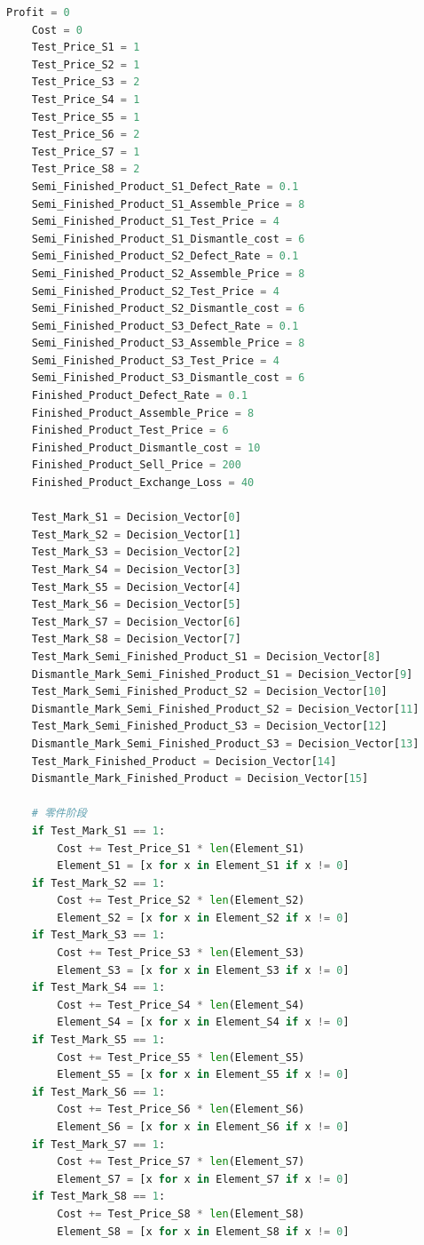 \documentclass[withoutpreface,bwprint]{cumcmthesis} %
\begin{document}
\begin{appendices}
\begin{lstlisting}[language=python]
    Profit = 0
    Cost = 0
    Test_Price_S1 = 1
    Test_Price_S2 = 1
    Test_Price_S3 = 2
    Test_Price_S4 = 1
    Test_Price_S5 = 1
    Test_Price_S6 = 2
    Test_Price_S7 = 1
    Test_Price_S8 = 2
    Semi_Finished_Product_S1_Defect_Rate = 0.1
    Semi_Finished_Product_S1_Assemble_Price = 8
    Semi_Finished_Product_S1_Test_Price = 4
    Semi_Finished_Product_S1_Dismantle_cost = 6
    Semi_Finished_Product_S2_Defect_Rate = 0.1
    Semi_Finished_Product_S2_Assemble_Price = 8
    Semi_Finished_Product_S2_Test_Price = 4
    Semi_Finished_Product_S2_Dismantle_cost = 6
    Semi_Finished_Product_S3_Defect_Rate = 0.1
    Semi_Finished_Product_S3_Assemble_Price = 8
    Semi_Finished_Product_S3_Test_Price = 4
    Semi_Finished_Product_S3_Dismantle_cost = 6
    Finished_Product_Defect_Rate = 0.1
    Finished_Product_Assemble_Price = 8
    Finished_Product_Test_Price = 6
    Finished_Product_Dismantle_cost = 10
    Finished_Product_Sell_Price = 200
    Finished_Product_Exchange_Loss = 40

    Test_Mark_S1 = Decision_Vector[0]
    Test_Mark_S2 = Decision_Vector[1]
    Test_Mark_S3 = Decision_Vector[2]
    Test_Mark_S4 = Decision_Vector[3]
    Test_Mark_S5 = Decision_Vector[4]
    Test_Mark_S6 = Decision_Vector[5]
    Test_Mark_S7 = Decision_Vector[6]
    Test_Mark_S8 = Decision_Vector[7]
    Test_Mark_Semi_Finished_Product_S1 = Decision_Vector[8]
    Dismantle_Mark_Semi_Finished_Product_S1 = Decision_Vector[9]
    Test_Mark_Semi_Finished_Product_S2 = Decision_Vector[10]
    Dismantle_Mark_Semi_Finished_Product_S2 = Decision_Vector[11]
    Test_Mark_Semi_Finished_Product_S3 = Decision_Vector[12]
    Dismantle_Mark_Semi_Finished_Product_S3 = Decision_Vector[13]
    Test_Mark_Finished_Product = Decision_Vector[14]
    Dismantle_Mark_Finished_Product = Decision_Vector[15]

    # 零件阶段
    if Test_Mark_S1 == 1:
        Cost += Test_Price_S1 * len(Element_S1)
        Element_S1 = [x for x in Element_S1 if x != 0]
    if Test_Mark_S2 == 1:
        Cost += Test_Price_S2 * len(Element_S2)
        Element_S2 = [x for x in Element_S2 if x != 0]
    if Test_Mark_S3 == 1:
        Cost += Test_Price_S3 * len(Element_S3)
        Element_S3 = [x for x in Element_S3 if x != 0]
    if Test_Mark_S4 == 1:
        Cost += Test_Price_S4 * len(Element_S4)
        Element_S4 = [x for x in Element_S4 if x != 0]
    if Test_Mark_S5 == 1:
        Cost += Test_Price_S5 * len(Element_S5)
        Element_S5 = [x for x in Element_S5 if x != 0]
    if Test_Mark_S6 == 1:
        Cost += Test_Price_S6 * len(Element_S6)
        Element_S6 = [x for x in Element_S6 if x != 0]
    if Test_Mark_S7 == 1:
        Cost += Test_Price_S7 * len(Element_S7)
        Element_S7 = [x for x in Element_S7 if x != 0]
    if Test_Mark_S8 == 1:
        Cost += Test_Price_S8 * len(Element_S8)
        Element_S8 = [x for x in Element_S8 if x != 0]


\end{lstlisting}
\end{appendices}
\end{document}
